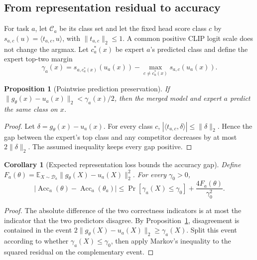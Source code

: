 \documentclass[letterpaper]{article} %
\theoremstyle{plain}
\newtheorem{proposition}[theorem]{Proposition}
\newtheorem{corollary}[theorem]{Corollary}
\theoremstyle{definition}
\begin{document}
\subsection{From representation residual to accuracy}
\label{app:accuracy}

For task $a$, let $\mathcal C_a$ be its class set and let the fixed head score class $c$ by $s_{a,c}(u)=\langle t_{a,c},u\rangle$, with $\|t_{a,c}\|_2\le1$.
A common positive CLIP logit scale does not change the argmax.
Let $c_a^*(x)$ be expert $a$'s predicted class and define the expert top-two margin
\begin{equation}
\gamma_a(x)=s_{a,c_a^*(x)}(u_a(x))-
\max_{c\ne c_a^*(x)}s_{a,c}(u_a(x)).
\label{eq:expert-margin}
\end{equation}

\begin{proposition}[Pointwise prediction preservation]
\label{prop:pointwise-margin}
If $\|g_\theta(x)-u_a(x)\|_2<\gamma_a(x)/2$, then the merged model and expert $a$ predict the same class on $x$.
\end{proposition}

\begin{proof}
Let $\delta=g_\theta(x)-u_a(x)$.
For every class $c$, $|\langle t_{a,c},\delta\rangle|\le\|\delta\|_2$.
Hence the gap between the expert's top class and any competitor decreases by at most $2\|\delta\|_2$.
The assumed inequality keeps every gap positive.
\end{proof}

\begin{corollary}[Expected representation loss bounds the accuracy gap]
\label{cor:accuracy-gap}
Define $F_a(\theta)=\mathbb E_{X\sim\mathcal D_a} \|g_\theta(X)-u_a(X)\|_2^2$.
For every $\gamma_0>0$,
\begin{equation}
\left|\operatorname{Acc}_a(\theta)-\operatorname{Acc}_a(\theta_a)\right|
\le
\Pr[\gamma_a(X)\le\gamma_0]
+\frac{4F_a(\theta)}{\gamma_0^2}.
\label{eq:accuracy-gap}
\end{equation}
\end{corollary}

\begin{proof}
The absolute difference of the two correctness indicators is at most the indicator that the two predictors disagree.
By Proposition~\ref{prop:pointwise-margin}, disagreement is contained in the event $2\|g_\theta(X)-u_a(X)\|_2\ge\gamma_a(X)$.
Split this event according to whether $\gamma_a(X)\le\gamma_0$, then apply Markov's inequality to the squared residual on the complementary event.
\end{proof}
\end{document}

